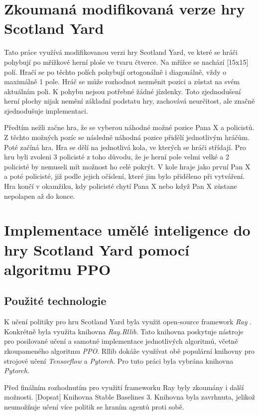 \section*{Zkoumaná modifikovaná verze hry Scotland Yard}

Tato práce využívá modifikovanou verzi hry Scotland Yard, ve které se hráči pohybují po mřížkové herní ploše ve tvaru čtverce.
Na mřížce se nachází {\color{red}[15x15]} polí.
Hračí se po těchto polích pohybují ortogonálně i diagonálně, vždy o maximálně 1 pole.
Hráč se může rozhodnot nezměnit pozici a zůstat na svém aktuálním poli.
K pohybu nejsou potřebné žádné jízdenky.
Toto zjednodušení herní plochy nijak nemění základní podstatu hry, zachovává neurčitost, ale značně zjednodušuje implementaci.

Předtím nežli začne hra, že se vyberou náhodné možné pozice Pana X a policistů.
Z těchto možných pozíc se následně náhodná pozice přidělí jednotlivým hráčům.
Poté začíná hra.
Hra se dělí na jednotlivá kola, ve kterých se hráči střídají.
Pro hru byli zvoleni 3 policisté z toho důvodu, že je herní pole velmi velké a 2 policisté by nemuseli mít možnost ho celé pokrýt.
V kole hraje jako první Pan X a poté policisté, již podle jejich očíslení, které jim bylo přiděleno při vytváření.
Hra končí v okamžiku, kdy policisté chytí Pana X nebo když Pan X zůstane nepolapen až do konce.

\section*{Implementace umělé inteligence do hry Scotland Yard pomocí algoritmu PPO}
\label{implementace}

\subsection{Použité technologie}
K učení politiky pro hru Scotland Yard byla využit open-source framework \emph{Ray} \cite{Ray}.
Konkrétně byla využita knihovna \emph{Ray.Rllib}.
Tato knihovna poskytuje nástroje pro posilované učení a samotné implementace jednotlivých algoritmů, včetně zkoupameného algoritmu \emph{PPO}.
Rllib dokáže využívat obě populární knihovny pro strojové učení \emph{Tensorflow} a \emph{Pytorch}.
Pro tuto práci byla vybrána knihovna \emph{Pytorch}.

Před finálním rozhodnutím pro využití frameworku Ray byly zkoumány i další možnosti.
{\color{red}[Dopsat]}
Knihovna Stable Baselines 3.
Knihovna byla zavrhnuta, jelikož neumožňuje učení více politik se hraním agentů proti sobě.

